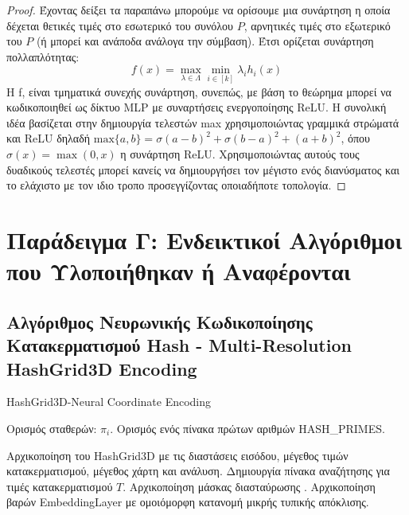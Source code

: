 \begin{appendices}
\begin{proof}
        Έχοντας δείξει τα παραπάνω μπορούμε να ορίσουμε μια συνάρτηση η οποία δέχεται θετικές τιμές στο εσωτερικό του συνόλου \(P\), αρνητικές τιμές στο εξωτερικό του \(P\) (ή μπορεί και ανάποδα ανάλογα την σύμβαση). Έτσι ορίζεται συνάρτηση πολλαπλότητας:
        \[
            f(x) = \max_{\lambda \in \Lambda} \min_{i \in [k]} \lambda_{i}h_{i}(x)
        \]
        Η f, είναι τμηματικά συνεχής συνάρτηση, συνεπώς, με βάση το θεώρημα μπορεί να κωδικοποιηθεί ως δίκτυο MLP με συναρτήσεις ενεργοποίησης ReLU. Η συνολική ιδέα βασίζεται στην δημιουργία τελεστών max χρησιμοποιώντας γραμμικά στρώματά και ReLU δηλαδή $\text{max} \{a, b\} = \sigma(a - b)^2 + \sigma(b - a)^2 + (a + b)^2$, όπου $\sigma(x) = \max(0, x) $ η συνάρτηση ReLU. Χρησιμοποιώντας αυτούς τους δυαδικούς τελεστές μπορεί κανείς να δημιουργήσει τον μέγιστο ενός διανύσματος και το ελάχιστο με τον ιδιο τροπο προσεγγίζοντας οποιαδήποτε τοπολογία.

    \end{proof}\cite{DBLP:journals/corr/abs-1905-11911}
   
    
    \section*{Παράδειγμα Γ: Ενδεικτικοί Αλγόριθμοι που Υλοποιήθηκαν ή Aναφέρονται }

        
        \label{section:appendix-algorithms}

        \subsection*{Αλγόριθμος Νευρωνικής Κωδικοποίησης Κατακερματισμού Hash - Multi-Resolution HashGrid3D Encoding}
        \begin{algorithm}[H]
            \caption{HashGrid3D-Neural Coordinate Encoding}
            \begin{algorithmic}
                \State Ορισμός σταθερών: $\pi_{i}$.
                \State Ορισμός ενός πίνακα πρώτων αριθμών HASH\_PRIMES.
                
                
                    \State \small{Αρχικοποίηση του HashGrid3D με τις διαστάσεις εισόδου, μέγεθος τιμών κατακερματισμού, μέγεθος χάρτη και ανάλυση}.
                    \State \small{Δημιουργία πίνακα αναζήτησης για τιμές κατακερματισμού $T$}.
                    \State \small{Αρχικοποίηση μάσκας διασταύρωσης }.
                    \State \small{Αρχικοποίηση βαρών EmbeddingLayer με ομοιόμορφη κατανομή μικρής τυπικής απόκλισης}.
                

\end{algorithmic}
\end{algorithm}
\end{appendices}
